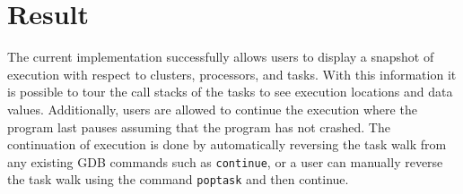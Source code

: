 \section{Result}
The current implementation successfully allows users to display a snapshot of
\uCPPS execution with respect to clusters, processors, and tasks. With this
information it is possible to tour the call stacks of the tasks to see
execution locations and data values. Additionally, users are allowed to
continue the execution where the program last pauses assuming that the program
has not crashed. The continuation of execution is done by automatically
reversing the task walk from any existing GDB commands such as \verb|continue|,
or a user can manually reverse the task walk using the command \verb|poptask|
and then continue.
